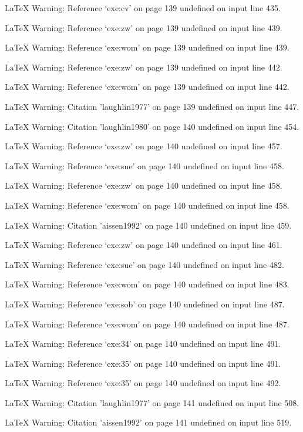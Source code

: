LaTeX Warning: Reference `exe:cv' on page 139 undefined on input line 435.


LaTeX Warning: Reference `exe:zw' on page 139 undefined on input line 439.


LaTeX Warning: Reference `exe:wom' on page 139 undefined on input line 439.


LaTeX Warning: Reference `exe:zw' on page 139 undefined on input line 442.


LaTeX Warning: Reference `exe:wom' on page 139 undefined on input line 442.


LaTeX Warning: Citation 'laughlin1977' on page 139 undefined on input line 447.


LaTeX Warning: Citation 'laughlin1980' on page 140 undefined on input line 454.


LaTeX Warning: Reference `exe:zw' on page 140 undefined on input line 457.


LaTeX Warning: Reference `exe:sue' on page 140 undefined on input line 458.


LaTeX Warning: Reference `exe:zw' on page 140 undefined on input line 458.


LaTeX Warning: Reference `exe:wom' on page 140 undefined on input line 458.


LaTeX Warning: Citation 'aissen1992' on page 140 undefined on input line 459.


LaTeX Warning: Reference `exe:zw' on page 140 undefined on input line 461.


LaTeX Warning: Reference `exe:sue' on page 140 undefined on input line 482.


LaTeX Warning: Reference `exe:wom' on page 140 undefined on input line 483.


LaTeX Warning: Reference `exe:sob' on page 140 undefined on input line 487.


LaTeX Warning: Reference `exe:wom' on page 140 undefined on input line 487.


LaTeX Warning: Reference `exe:34' on page 140 undefined on input line 491.


LaTeX Warning: Reference `exe:35' on page 140 undefined on input line 491.


LaTeX Warning: Reference `exe:35' on page 140 undefined on input line 492.


LaTeX Warning: Citation 'laughlin1977' on page 141 undefined on input line 508.


LaTeX Warning: Citation 'aissen1992' on page 141 undefined on input line 519.


